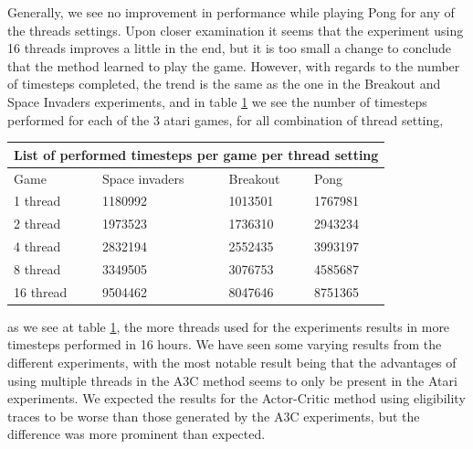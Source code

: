 \documentclass[11pt]{article}
\begin{document}
Generally, we see no improvement in performance while playing Pong for any of the threads settings.
Upon closer examination it seems that the experiment using 16 threads improves a little
in the end, but it is too small a change to conclude that the method learned to play the 
game.
However, with regards to the number of timesteps completed,
the trend is the same as the one in the Breakout and Space Invaders
experiments, and in table \ref{table:compare_timesteps} we see the number of timesteps performed
for each of the 3 atari games, for all combination of thread setting,
\begin{table}[H]
\centering
\begin{tabular}{ |p{3cm}||p{3cm}|p{3cm}|p{3cm}|  }
 \hline
 \multicolumn{4}{|c|}{List of performed timesteps per game per thread setting} \\
 \hline
      Game & Space invaders  & Breakout & Pong\\
 \hline
 1 thread   & 1180992    & 1013501&   1767981\\
 \hline
 2 thread&   1973523  & 1736310   & 2943234\\
 \hline
 4 thread& 2832194 & 2552435&  3993197\\
 \hline
 8 thread   & 3349505 & 3076753 &  4585687\\
 \hline
 16 thread&   9504462  & 8047646 & 8751365\\
 \hline
\end{tabular}
\label{table:compare_timesteps}
\end{table}

as we see at table \ref{table:compare_timesteps}, the more threads
used for the experiments results in more timesteps performed in 16 hours.
We have seen some varying results from the different experiments, with
the most notable result being that the advantages of using multiple threads in the A3C method
seems to only be present in the Atari experiments.
We expected the results for the Actor-Critic method using eligibility traces
to be worse than those generated by the A3C experiments, 
but the difference was more prominent than expected.
\end{document}

